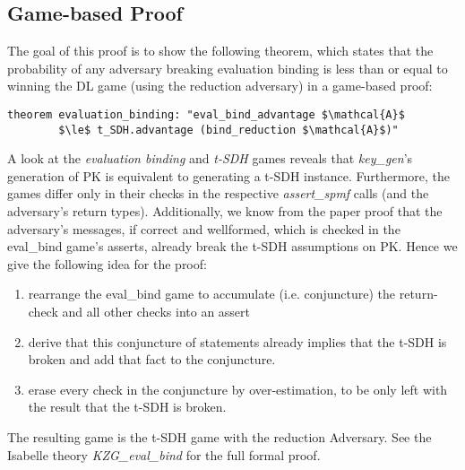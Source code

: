 \subsection*{Game-based Proof}
\label{security:binding:gamebased}
The goal of this proof is to show the following theorem, which states that the probability of any adversary breaking evaluation binding is less than or equal to winning the DL game (using the reduction adversary) in a game-based proof:
\begin{lstlisting}[language=isabelle]
    theorem evaluation_binding: "eval_bind_advantage $\mathcal{A}$ 
        $\le$ t_SDH.advantage (bind_reduction $\mathcal{A}$)"
\end{lstlisting}

A look at the \textit{evaluation binding} and \textit{t-SDH} games reveals that \textit{key\_gen}'s generation of PK is equivalent to generating a t-SDH instance. Furthermore, the games differ only in their checks in the respective \textit{assert\_spmf} calls (and the adversary's return types).  
Additionally, we know from the paper proof that the adversary's messages, if correct and wellformed, which is checked in the eval\_bind game's asserts, already break the t-SDH assumptions on PK. 
Hence we give the following idea for the proof:
\begin{enumerate}
    \item rearrange the eval\_bind game to accumulate (i.e. conjuncture) the return-check and all other checks into an assert
    \item derive that this conjuncture of statements already implies that the t-SDH is broken and add that fact to the conjuncture.
    \item erase every check in the conjuncture by over-estimation, to be only left with the result that the t-SDH is broken.
\end{enumerate}
The resulting game is the t-SDH game with the reduction Adversary. 
See the Isabelle theory \textit{KZG\_eval\_bind} for the full formal proof.

